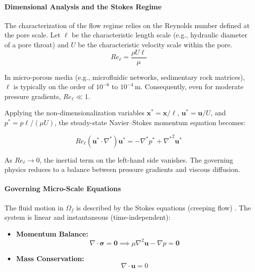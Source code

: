\paragraph{Dimensional Analysis and the Stokes Regime}
The characterization of the flow regime relies on the Reynolds number defined at the pore scale.
Let $\ell$ be the characteristic length scale (e.g., hydraulic diameter of a pore throat) and $U$ be the characteristic velocity scale within the pore.
\begin{equation}
    Re_\ell = \frac{\rho U \ell}{\mu}
\end{equation}

In micro-porous media (e.g., microfluidic networks, sedimentary rock matrices), $\ell$ is typically on the order of $10^{-6}$ to $10^{-4}$\,m.
Consequently, even for moderate pressure gradients, $Re_\ell \ll 1$.

Applying the non-dimensionalization variables $\mathbf{x}^* = \mathbf{x}/\ell$, $\mathbf{u}^* = \mathbf{u}/U$, and $p^* = p \ell / (\mu U)$, the steady-state Navier--Stokes momentum equation becomes:

\begin{equation}
    Re_\ell (\mathbf{u}^* \cdot \nabla^*) \mathbf{u}^* = -\nabla^* p^* + {\nabla^*}^2 \mathbf{u}^*
\end{equation}

As $Re_\ell \to 0$, the inertial term on the left-hand side vanishes.
The governing physics reduces to a balance between pressure gradients and viscous diffusion.

\paragraph{Governing Micro-Scale Equations}
The fluid motion in $\Omega_f$ is described by the Stokes equations (creeping flow) \cite{stokes1851effect}.
The system is linear and instantaneous (time-independent):

\begin{itemize}
    \item \textbf{Momentum Balance:}
    \begin{equation}
        \nabla \cdot \boldsymbol{\sigma} = \mathbf{0} \implies \mu \nabla^2 \mathbf{u} - \nabla p = \mathbf{0}
    \end{equation}
    \item \textbf{Mass Conservation:}
    \begin{equation}
        \nabla \cdot \mathbf{u} = 0
    \end{equation}
\end{itemize}

